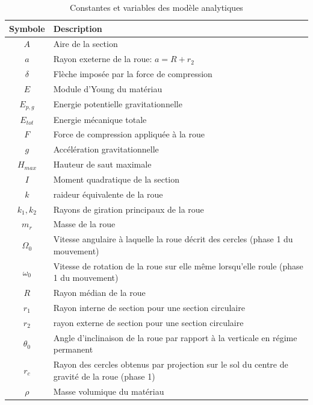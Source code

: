 \label{sec:Theme1}
\begin{table}[htbp]
  \centering
  \caption{Constantes et variables des modèle analytiques}
  \begin{tabular}{|c|l|}
    \hline\rowcolor[gray]{0.8}\color{black}
    Symbole         & Description\\\hline
    $A$           & Aire de la section\\\hline
    $a$       & Rayon exeterne de la roue: $a=R+r_2$\\\hline
    $\delta$             & Flèche imposée par la force de compression\\\hline
    $E$           & Module d'Young du matériau\\\hline
    $E_{p,g}$          & Energie potentielle gravitationnelle\\\hline
    $E_{tot}$          & Energie mécanique totale\\\hline
    $F$             & Force de compression appliquée à la roue\\\hline
    $g$     & Accélération gravitationnelle\\\hline
    $H_{max}$          & Hauteur de saut maximale\\\hline
    $I$           & Moment quadratique de la section\\\hline
    $k$             & raideur équivalente de la roue\\\hline
    $k_1, k_2$           & Rayons de giration principaux de la roue\\\hline
    $m_r$          & Masse de la roue\\\hline
    $\Omega_0$           & Vitesse angulaire à laquelle la roue décrit des cercles (phase 1 du mouvement)\\\hline
    $\omega_0$           & Vitesse de rotation de la roue sur elle même lorsqu'elle roule (phase 1 du mouvement)\\\hline
    $R$       & Rayon médian de la roue\\\hline
    $r_1$ & Rayon interne de section pour une section circulaire\\\hline
    $r_2$             & rayon externe de section pour une section circulaire\\\hline
    $\theta_0$           & Angle d'inclinaison de la roue par rapport à la verticale en régime permanent\\\hline
    $r_c$           & Rayon des cercles obtenus par projection sur le sol du centre de gravité de la roue (phase 1)\\\hline
    $\rho$           & Masse volumique du matériau\\\hline
  \end{tabular}
  \label{tab:Definitions}
\end{table}



